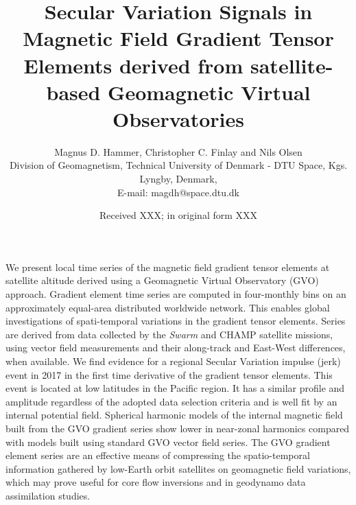 \documentclass[extra,mreferee]{gji}
\title[Secular Variation Signals in Magnetic Field Gradient Tensor Elements]{Secular Variation Signals in Magnetic Field Gradient Tensor Elements derived from satellite-based Geomagnetic Virtual Observatories}
\author[Hammer, Finlay and Olsen]{Magnus D. Hammer, Christopher C. Finlay and Nils Olsen\\
Division of Geomagnetism, Technical University of Denmark - DTU Space, Kgs. Lyngby, Denmark,\\
E-mail: magdh@space.dtu.dk \\
}
\date{Received XXX; in original form XXX}
\begin{document}
\maketitle
\vspace{-1.0cm}
\begin{summary}
We present local time series of the magnetic field gradient tensor elements at satellite altitude derived using a Geomagnetic Virtual Observatory (GVO) approach. Gradient element time series are computed in four-monthly bins on an approximately equal-area distributed worldwide network. This enables global investigations of spati-temporal variations in the gradient tensor elements. Series are derived from data collected by the {\it Swarm} and CHAMP satellite missions, using vector field measurements and their along-track and East-West differences, when available.
We find evidence for a regional Secular Variation impulse (jerk) event in 2017 in the first time derivative  of the gradient tensor elements.  This event is located at low latitudes in the Pacific region. It has a similar profile and amplitude regardless of the adopted data selection criteria and is well fit by an internal potential field. Spherical harmonic models of the internal magnetic field built from the GVO gradient series show lower  in  near-zonal harmonics compared with models built using standard GVO vector field series. The GVO gradient element series are an effective means of compressing the spatio-temporal information gathered by low-Earth orbit satellites on geomagnetic field variations, which may prove useful for core flow inversions and in geodynamo data assimilation studies.
\end{summary}
\begin{keywords}
\end{keywords}
\end{document}
